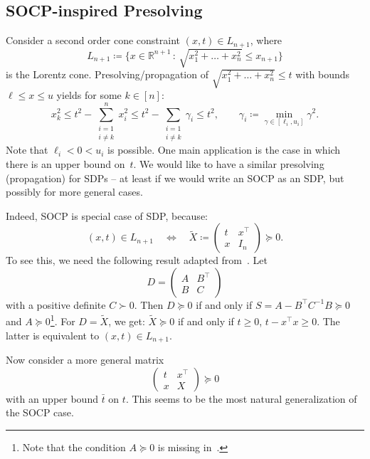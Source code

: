 \documentclass[10pt, a4paper]{article}
\newcommand{\suchthat}{\,:\,}
\newcommand{\define}{\coloneqq}
\newcommand{\T}{^{\top}}
\newcommand{\R}{\mathds{R}}
\begin{document}
\subsection{SOCP-inspired Presolving}

Consider a second order cone constraint $(x,t) \in L_{n+1}$, where
\[
  L_{n+1} \define \Big\{x \in \R^{n+1} \suchthat \sqrt{x_1^2 + \dots + x_n^2}
  \leq x_{n+1}\Big\}
\]
is the Lorentz cone.  Presolving/propagation of
$\sqrt{x_1^2 + \dots + x_n^2} \leq t$ with bounds $\ell \leq x \leq u$
yields for some $k \in [n]$:
\begin{equation}\label{eq:SOCPpre}
  x_k^2 \leq t^2 - \sum_{\substack{i=1\\ i \neq k}}^n x_i^2 \leq t^2 -
  \sum_{\substack{i=1\\ i \neq k}} \gamma_i \leq t^2,\qquad
  \gamma_i \define \min_{\gamma \in [\ell_i, u_i]} \gamma^2.
\end{equation}
Note that $\ell_i < 0 < u_i$ is possible. One main application is the case
in which there is an upper bound on~$t$. We would like to have a similar
presolving (propagation) for SDPs -- at least if we would write an SOCP as
an SDP, but possibly for more general cases.

Indeed, SOCP is special case of SDP, because:
\[
  (x,t) \in L_{n+1} \quad\Leftrightarrow\quad
  \tilde{X} \define
  \begin{pmatrix}
    t & x\T\\
    x & I_n
  \end{pmatrix}
  \succeq 0.
\]
To see this, we need the following result adapted
from~\cite[Section~A.5.5]{BoyV09}. Let
\[
  D = \begin{pmatrix}
    A & B\T\\
    B & C
  \end{pmatrix}
\]
with a positive definite $C \succ 0$. Then $D \succeq 0$ if and only if
$S = A - B\T C^{-1} B \succeq 0$ and $A \succeq 0$\footnote{Note that the
  condition $A \succeq 0$ is missing in~\cite{BoyV09}.}. For $D = \tilde{X}$, we
get: $\tilde{X} \succeq 0$ if and only if $t \geq 0$, $t - x\T x \geq
0$. The latter is equivalent to $(x,t) \in L_{n+1}$.

Now consider a more general matrix
\begin{equation}\label{eq:GeneralPSD}
  \begin{pmatrix}
    t & x\T\\
    x & X
  \end{pmatrix}
  \succeq 0
\end{equation}
with an upper bound $\bar{t}$ on $t$. This seems to be the most natural
generalization of the SOCP case.
\end{document}
